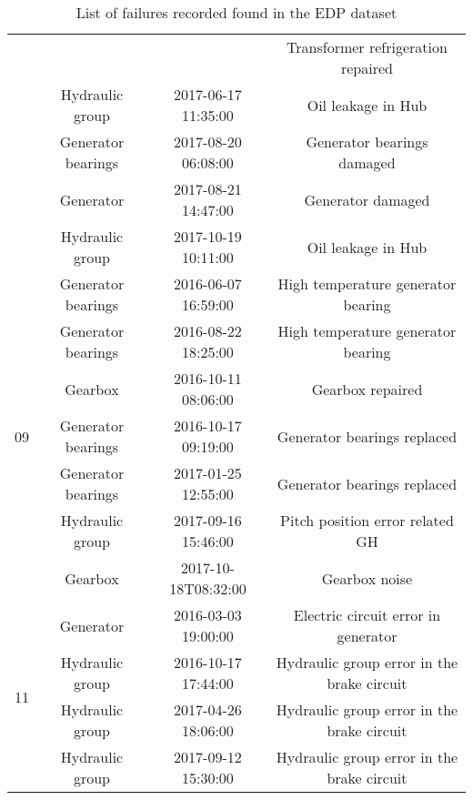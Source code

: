 \begin{table}[h]
\begin{tabular}{|c|c|c|c|}
    & & & Transformer refrigeration repaired \\
    & Hydraulic group & 2017-06-17 11:35:00 & Oil leakage in Hub \\
    & Generator bearings & 2017-08-20 06:08:00 & Generator bearings damaged \\
    & Generator & 2017-08-21 14:47:00 & Generator damaged \\
    & Hydraulic group & 2017-10-19 10:11:00 & Oil leakage in Hub \\
    \hline
    \multirow{7}{*}{09} & Generator bearings & 2016-06-07 16:59:00 & High temperature generator bearing \\
    & Generator bearings & 2016-08-22 18:25:00 & High temperature generator bearing \\
    & Gearbox & 2016-10-11 08:06:00 & Gearbox repaired \\
    & Generator bearings & 2016-10-17 09:19:00 & Generator bearings replaced \\
    & Generator bearings & 2017-01-25 12:55:00 & Generator bearings replaced \\
    & Hydraulic group & 2017-09-16 15:46:00 & Pitch position error related GH \\
    & Gearbox & 2017-10-18T08:32:00 & Gearbox noise \\
    \hline
    \multirow{4}{*}{11} & Generator & 2016-03-03 19:00:00 & Electric circuit error in generator \\
    & Hydraulic group & 2016-10-17 17:44:00 & Hydraulic group error in the brake circuit \\
    & Hydraulic group & 2017-04-26 18:06:00 & Hydraulic group error in the brake circuit \\
    & Hydraulic group & 2017-09-12 15:30:00 & Hydraulic group error in the brake circuit \\
    \hline
    \end{tabular}
    \caption{List of failures recorded found in the EDP dataset}
    \label{tab:failures}
\end{table}

